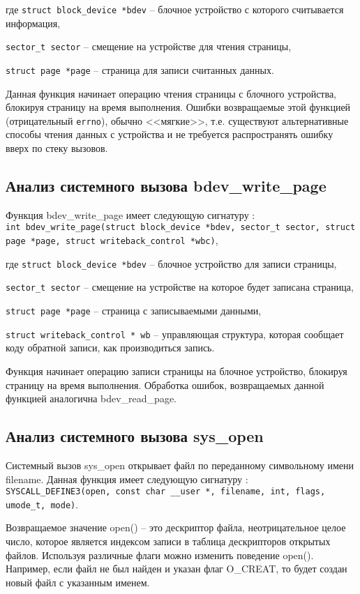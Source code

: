 		где \lstinline{struct block_device *bdev} -- блочное устройство с которого считывается информация,

		\lstinline{sector_t sector} -- смещение на устройстве для чтения страницы,
		
		\lstinline{struct page *page} -- страница для записи считанных данных.

		Данная функция начинает операцию чтения страницы с блочного устройства, 
		блокируя страницу на время выполнения.
		Ошибки возвращаемые этой функцией (отрицательный \lstinline{errno}), обычно <<мягкие>>, 
		т.е. существуют альтернативные способы чтения данных с устройства и
		не требуется распространять ошибку вверх по стеку вызовов.

	 \subsection*{Анализ системного вызова bdev\_write\_page}
		Функция bdev\_write\_page имеет следующую сигнатуру \cite{linux-bdev_write_page}:\\
		\lstinline{int bdev_write_page(struct block_device *bdev, sector_t sector, struct page *page, struct writeback_control *wbc)},
		
		где \lstinline{struct block_device *bdev} -- блочное устройство для записи страницы,

		\lstinline{sector_t sector} -- смещение на устройстве на которое будет записана страница,

		\lstinline{struct page *page} -- страница с записываемыми данными,

		\lstinline{struct writeback_control * wb} -- управляющая структура, которая сообщает коду обратной записи, как производиться запись.
		
		Функция начинает операцию записи страницы на блочное устройство, блокируя страницу на время выполнения.
		Обработка ошибок, возвращаемых данной функцией аналогична bdev\_read\_page.

	\subsection*{Анализ системного вызова sys\_open}
		Системный вызов sys\_open открывает файл по переданному символьному имени filename.
	    Данная функция имеет следующую сигнатуру \cite{linux-sys_open}: \\
		\lstinline{SYSCALL_DEFINE3(open, const char __user *, filename, int, flags, umode_t, mode)}.

	   Возвращаемое значение open() -- это дескриптор файла, неотрицательное целое число, 
	   которое является индексом записи в таблица дескрипторов открытых файлов.
	   Используя различные флаги можно изменить поведение open().
	   Например, если файл не был найден и указан флаг O\_CREAT, 
	   то будет создан новый файл с указанным именем.

